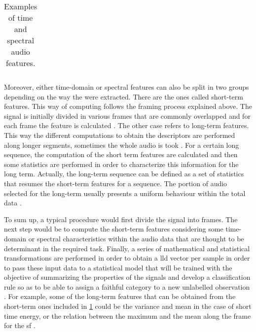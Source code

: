 \begin{table}[h!]
\begin{center}
\begin{tabular}{|| m{9em} | m{24em} ||}
				\hline
			\end{tabular}
		\end{center}
		\caption{Examples of time  and spectral audio features.}
		\label{table:6}
	\end{table}

	Moreover, either time-domain or spectral features can also be split in two groups depending on the way the were extracted. There are the ones called short-term features. This way of computing follows the framing process explained above. The signal is initially divided in various frames that are commonly overlapped and for each frame the feature is calculated \cite{Giannakopoulos2014}. The other case refers to long-term features. This way the different computations to obtain the descriptors are performed along longer segments, sometimes the whole audio is took \cite{BUYUK2018}. For a certain long sequence, the computation of the short term features are calculated and then some statistics are performed in order to characterize this information for the long term. Actually, the long-term sequence can be defined as a set of statistics that resumes the short-term features for a sequence. The portion of audio selected for the long-term usually presents a uniform behaviour within the total data \cite{Giannakopoulos2014}.

	To sum up, a typical procedure would first divide the signal into frames. The next step would be to compute the short-term features considering some time-domain or spectral characteristics within the audio data that are thought to be determinant in the required task. Finally, a series of mathematical and statistical transformations are performed in order to obtain a \acrshort{lld} vector per sample in order to pass these input data to a statistical model that will be trained with the objective of summarizing the properties of the signals and develop a classification rule so as to be able to assign a faithful category to a new unlabelled observation \cite{Stowell2015}. For example, some of the long-term features that can be obtained from the short-term ones included in \ref{table:6} could be the variance and mean in the case of short time energy, or the relation between the maximum and the mean along the frame for the \acrshort{sf} \cite{Giannakopoulos2006}.
		

